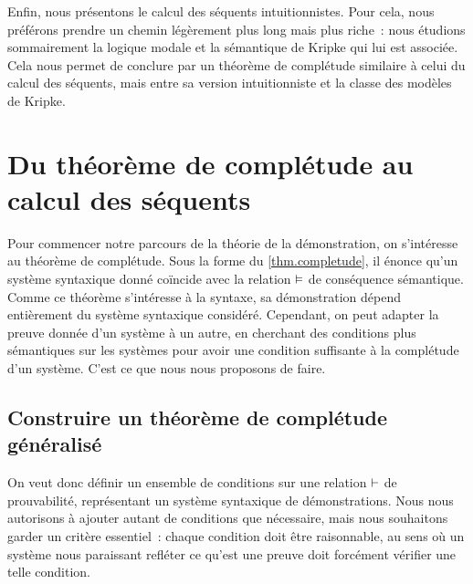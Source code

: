 Enfin, nous présentons le calcul des séquents intuitionnistes. Pour cela, nous
préférons prendre un chemin légèrement plus long mais plus riche~: nous étudions
sommairement la logique modale et la sémantique de Kripke qui lui est associée.
Cela nous permet de conclure par un théorème de complétude similaire à celui du
calcul des séquents, mais entre sa version intuitionniste et la classe des
modèles de Kripke.

\section[Complétude et séquents]{Du
    théorème de complétude au calcul des séquents}

Pour commencer notre parcours de la théorie de la démonstration, on s'intéresse
au théorème de complétude. Sous la forme du \cref{thm.completude}, il énonce
qu'un système syntaxique donné coïncide avec la relation $\vDash$ de
conséquence sémantique. Comme ce théorème s'intéresse à la syntaxe, sa
démonstration dépend entièrement du système syntaxique considéré. Cependant, on
peut adapter la preuve donnée d'un système à un autre, en cherchant des
conditions plus sémantiques sur les systèmes pour avoir une condition suffisante
à la complétude d'un système. C'est ce que nous nous proposons de faire.

\subsection{Construire un théorème de complétude généralisé}

On veut donc définir un ensemble de conditions sur une relation $\vdash$ de
prouvabilité, représentant un système syntaxique de démonstrations.
Nous nous autorisons à ajouter autant de conditions que nécessaire, mais nous
souhaitons garder un critère essentiel~: chaque condition doit être raisonnable,
au sens où un système nous paraissant refléter ce qu'est une preuve doit
forcément vérifier une telle condition.


